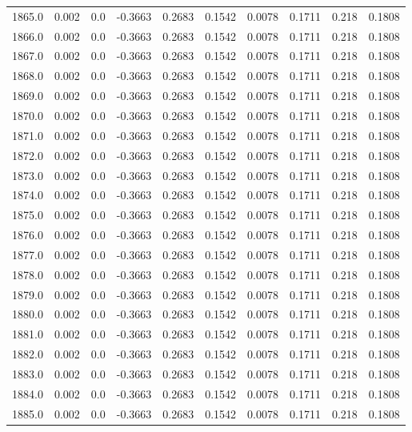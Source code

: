 \begin{longtable}{lrrrrrrrrr}
1865.0 & 0.002 & 0.0 & -0.3663 & 0.2683 & 0.1542 & 0.0078 & 0.1711 & 0.218 & 0.1808 \\
1866.0 & 0.002 & 0.0 & -0.3663 & 0.2683 & 0.1542 & 0.0078 & 0.1711 & 0.218 & 0.1808 \\
1867.0 & 0.002 & 0.0 & -0.3663 & 0.2683 & 0.1542 & 0.0078 & 0.1711 & 0.218 & 0.1808 \\
1868.0 & 0.002 & 0.0 & -0.3663 & 0.2683 & 0.1542 & 0.0078 & 0.1711 & 0.218 & 0.1808 \\
1869.0 & 0.002 & 0.0 & -0.3663 & 0.2683 & 0.1542 & 0.0078 & 0.1711 & 0.218 & 0.1808 \\
1870.0 & 0.002 & 0.0 & -0.3663 & 0.2683 & 0.1542 & 0.0078 & 0.1711 & 0.218 & 0.1808 \\
1871.0 & 0.002 & 0.0 & -0.3663 & 0.2683 & 0.1542 & 0.0078 & 0.1711 & 0.218 & 0.1808 \\
1872.0 & 0.002 & 0.0 & -0.3663 & 0.2683 & 0.1542 & 0.0078 & 0.1711 & 0.218 & 0.1808 \\
1873.0 & 0.002 & 0.0 & -0.3663 & 0.2683 & 0.1542 & 0.0078 & 0.1711 & 0.218 & 0.1808 \\
1874.0 & 0.002 & 0.0 & -0.3663 & 0.2683 & 0.1542 & 0.0078 & 0.1711 & 0.218 & 0.1808 \\
1875.0 & 0.002 & 0.0 & -0.3663 & 0.2683 & 0.1542 & 0.0078 & 0.1711 & 0.218 & 0.1808 \\
1876.0 & 0.002 & 0.0 & -0.3663 & 0.2683 & 0.1542 & 0.0078 & 0.1711 & 0.218 & 0.1808 \\
1877.0 & 0.002 & 0.0 & -0.3663 & 0.2683 & 0.1542 & 0.0078 & 0.1711 & 0.218 & 0.1808 \\
1878.0 & 0.002 & 0.0 & -0.3663 & 0.2683 & 0.1542 & 0.0078 & 0.1711 & 0.218 & 0.1808 \\
1879.0 & 0.002 & 0.0 & -0.3663 & 0.2683 & 0.1542 & 0.0078 & 0.1711 & 0.218 & 0.1808 \\
1880.0 & 0.002 & 0.0 & -0.3663 & 0.2683 & 0.1542 & 0.0078 & 0.1711 & 0.218 & 0.1808 \\
1881.0 & 0.002 & 0.0 & -0.3663 & 0.2683 & 0.1542 & 0.0078 & 0.1711 & 0.218 & 0.1808 \\
1882.0 & 0.002 & 0.0 & -0.3663 & 0.2683 & 0.1542 & 0.0078 & 0.1711 & 0.218 & 0.1808 \\
1883.0 & 0.002 & 0.0 & -0.3663 & 0.2683 & 0.1542 & 0.0078 & 0.1711 & 0.218 & 0.1808 \\
1884.0 & 0.002 & 0.0 & -0.3663 & 0.2683 & 0.1542 & 0.0078 & 0.1711 & 0.218 & 0.1808 \\
1885.0 & 0.002 & 0.0 & -0.3663 & 0.2683 & 0.1542 & 0.0078 & 0.1711 & 0.218 & 0.1808 \\

\end{longtable}
